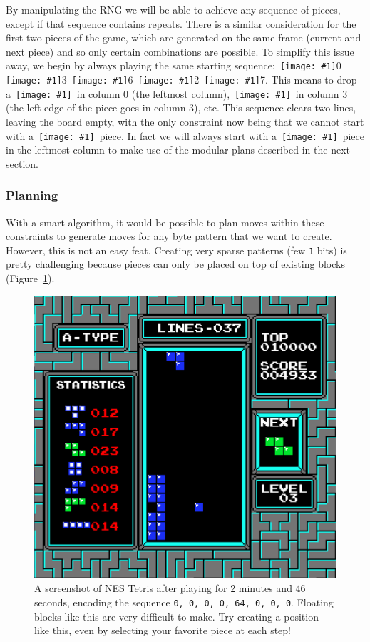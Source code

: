 \documentclass[twocolumn]{article}
\newcommand\tetrispiece[1]{\,\texttt{[image: \#1]}\hspace{0.1em}}
\newcommand\squarepiece{\tetrispiece{square}}
\newcommand\jleft{\tetrispiece{j_left}}
\newcommand\jright{\tetrispiece{j_right}}
\newcommand\shoriz{\tetrispiece{s_horiz}}
\newcommand\lleft{\tetrispiece{l_left}}
\newcommand\lright{\tetrispiece{l_right}}
\begin{document}
By manipulating the RNG we will be able to achieve any sequence of
pieces, except if that sequence contains repeats. There is a similar
consideration for the first two pieces of the game, which are
generated on the same frame (current and next piece) and so only
certain combinations are possible. To simplify this issue away, we
begin by always playing the same starting sequence: \squarepiece 0
\lleft 3 \jright 6 \lright 2 \jleft 7. This means to drop a
\squarepiece\ in column 0 (the leftmost column), \lleft\ in column 3
(the left edge of the piece goes in column 3), etc. This sequence
clears two lines, leaving the board empty, with the only constraint
now being that we cannot start with a \jleft\ piece. In fact we will
always start with a \shoriz\ piece in the leftmost column to make
use of the modular plans described in the next section.

\subsubsection{Planning}

With a smart algorithm, it would be possible to plan moves within
these constraints to generate moves for any byte pattern that we want
to create. However, this is not an easy feat. Creating very sparse
patterns (few {\tt 1} bits) is pretty challenging because pieces can
only be placed on top of existing blocks (Figure~\ref{fig:tetrisdot}).

\begin{figure}
  \includegraphics[width=\linewidth]{tetrisdot}
  \caption{
    A screenshot of NES Tetris after playing for 2 minutes and 46
    seconds, encoding the sequence {\tt 0, 0, 0, 0, 64, 0, 0, 0}.
    Floating blocks like this are very difficult to make. Try
    creating a position like this, even by selecting your favorite
    piece at each step!
  } \label{fig:tetrisdot}
\end{figure}
\end{document}
